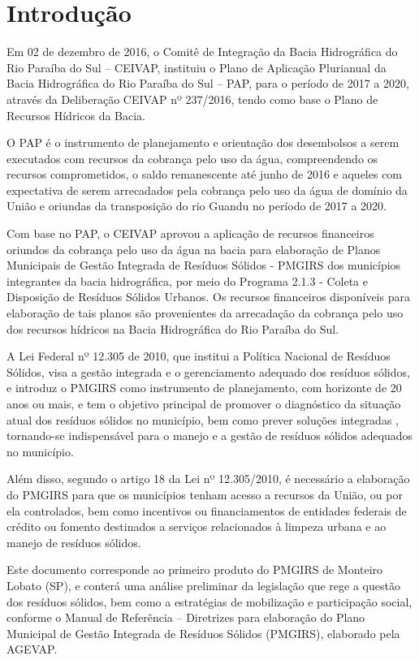 	\section{Introdução}
	
	Em 02 de dezembro de 2016, o Comitê de Integração da Bacia Hidrográfica do Rio Paraíba do Sul – CEIVAP, instituiu o Plano de Aplicação Plurianual da Bacia Hidrográfica do Rio Paraíba do Sul – PAP, para o período de 2017 a 2020, através da Deliberação CEIVAP nº 237/2016, tendo como base o Plano de Recursos Hídricos da Bacia.
	
	O PAP é o instrumento de planejamento e orientação dos desembolsos a serem executados com recursos da cobrança pelo uso da água, compreendendo os recursos comprometidos, o saldo remanescente até junho de 2016 e aqueles com expectativa de serem arrecadados pela cobrança pelo uso da água de domínio da União e oriundas da transposição do rio Guandu no período de 2017 a 2020.
	
	Com base no PAP, o CEIVAP aprovou a aplicação de recursos financeiros oriundos da cobrança pelo uso da água na bacia para elaboração de Planos Municipais de Gestão Integrada de Resíduos Sólidos - PMGIRS dos municípios integrantes da bacia hidrográfica, por meio do Programa 2.1.3 - Coleta e Disposição de Resíduos Sólidos Urbanos. Os recursos financeiros disponíveis para elaboração de tais planos são provenientes da arrecadação da cobrança pelo uso dos recursos hídricos na Bacia Hidrográfica do Rio Paraíba do Sul.
	
	A Lei Federal nº 12.305 de 2010, que institui a Política Nacional de Resíduos Sólidos, visa a gestão integrada e o gerenciamento adequado dos resíduos sólidos, e introduz o PMGIRS como instrumento de planejamento, com horizonte de 20 anos ou mais, e tem o objetivo principal de promover o diagnóstico da situação atual dos resíduos sólidos no município, bem como prever soluções integradas  \cite{brasil:12305}, tornando-se indispensável para o manejo e a gestão de resíduos sólidos adequados no município.
	
	Além disso, segundo o artigo 18 da Lei nº 12.305/2010, é necessário a elaboração do PMGIRS para que os municípios tenham acesso a recursos da União, ou por ela controlados, bem como incentivos ou financiamentos de entidades federais de crédito ou fomento destinados a serviços relacionados à limpeza urbana e ao manejo de resíduos sólidos.
	
	Este documento corresponde ao primeiro produto do PMGIRS de Monteiro Lobato (SP), e conterá uma análise preliminar da legislação que rege a questão dos resíduos sólidos, bem como a estratégias de mobilização e participação social, conforme o Manual de Referência – Diretrizes para elaboração do Plano Municipal de Gestão Integrada de Resíduos Sólidos (PMGIRS), elaborado pela AGEVAP.

